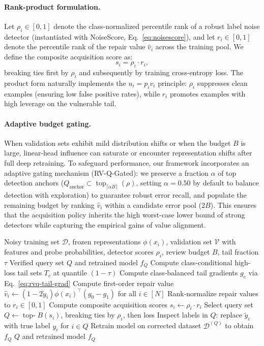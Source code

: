 \documentclass{article}
\begin{document}
\paragraph{Rank-product formulation.}
Let $\rho_i \in [0, 1]$ denote the class-normalized percentile rank of a robust label noise detector (instantiated with NoiseScore, Eq.~\ref{eq:noisescore}), and let $r_i \in [0, 1]$ denote the percentile rank of the repair value $\hat v_i$ across the training pool. We define the composite acquisition score as:
\begin{equation}
  s_i = \rho_i \cdot r_i,
  \label{eq:score}
\end{equation}
breaking ties first by $\rho_i$ and subsequently by training cross-entropy loss. The product form naturally implements the $u_i = p_i v_i$ principle: $\rho_i$ suppresses clean examples (ensuring low false positive rates), while $r_i$ promotes examples with high leverage on the vulnerable tail.

\paragraph{Adaptive budget gating.}
When validation sets exhibit mild distribution shifts or when the budget $B$ is large, linear-head influence can saturate or encounter representation shifts after full deep retraining. To safeguard performance, our framework incorporates an adaptive gating mechanism (RV-Q-Gated): we preserve a fraction $\alpha$ of top detection anchors ($Q_{\text{anchor}} \subset \operatorname{top}_{\lceil \alpha B \rceil}(\rho)$, setting $\alpha = 0.50$ by default to balance detection with exploration) to guarantee robust error recall, and populate the remaining budget by ranking $\hat v_i$ within a candidate error pool ($2B$). This ensures that the acquisition policy inherits the high worst-case lower bound of strong detectors while capturing the empirical gains of value alignment.

\begin{algorithm}[t]
\caption{Value-Aligned Verification Algorithm (VAVA / RV-Q)}
\label{alg:repairvalue}
\begin{algorithmic}[1]
\Require Noisy training set $\mathcal D$, frozen representations $\phi(x_i)$, validation set $\mathcal V$ with features and probe probabilities, detector scores $\rho_i$, review budget $B$, tail fraction $\tau$
\Ensure Verified query set $Q$ and retrained model $f_Q$
\State Compute class-conditional high-loss tail sets $T_c$ at quantile $(1-\tau)$
\State Compute class-balanced tail gradients $g_c$ via Eq.~\eqref{eq:rvq-tail-grad}
\State Compute first-order repair value $\hat v_i \leftarrow (1-2\tilde y_i) \phi(x_i)^\top (g_0 - g_1)$ for all $i \in [N]$
\State Rank-normalize repair values to $r_i \in [0, 1]$
\State Compute composite acquisition scores $s_i \leftarrow \rho_i \cdot r_i$
\State Select query set $Q \leftarrow \operatorname{top-}B(s_i)$, breaking ties by $\rho_i$, then loss
\State Inspect labels in $Q$: replace $\tilde y_i$ with true label $y_i$ for $i \in Q$
\State Retrain model on corrected dataset $\mathcal D^{(Q)}$ to obtain $f_Q$
\State \Return $Q$ and retrained model $f_Q$
\end{algorithmic}
\end{algorithm}
\end{document}
